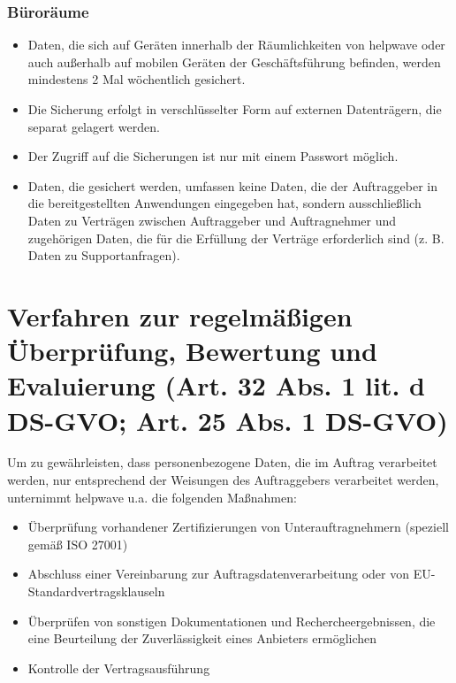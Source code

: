 \documentclass[10pt]{article}
\begin{document}
\subsubsection{Büroräume}
\begin{itemize}
	\item Daten, die sich auf Geräten innerhalb der Räumlichkeiten von helpwave oder auch
	      außerhalb auf mobilen Geräten der Geschäftsführung befinden, werden mindestens
	      2 Mal wöchentlich gesichert.
	\item Die Sicherung erfolgt in verschlüsselter Form auf externen Datenträgern, die separat
	      gelagert werden.
	\item Der Zugriff auf die Sicherungen ist nur mit einem Passwort möglich.
	\item Daten, die gesichert werden, umfassen keine Daten, die der Auftraggeber in die
	      bereitgestellten Anwendungen eingegeben hat, sondern ausschließlich Daten zu
	      Verträgen zwischen Auftraggeber und Auftragnehmer und zugehörigen Daten, die für
	      die Erfüllung der Verträge erforderlich sind (z. B. Daten zu Supportanfragen).
\end{itemize}

\section{Verfahren zur regelmäßigen Überprüfung, Bewertung und Evaluierung (Art. 32 Abs. 1 lit. d DS-GVO; Art. 25 Abs. 1 DS-GVO)}
Um zu gewährleisten, dass personenbezogene Daten, die im Auftrag verarbeitet werden, nur
entsprechend der Weisungen des Auftraggebers verarbeitet werden, unternimmt helpwave
u.a. die folgenden Maßnahmen:
\begin{itemize}
	\item Überprüfung vorhandener Zertifizierungen von Unterauftragnehmern (speziell
	      gemäß ISO 27001)
	\item Abschluss einer Vereinbarung zur Auftragsdatenverarbeitung oder von EU-
	      Standardvertragsklauseln
	\item Überprüfen von sonstigen Dokumentationen und Rechercheergebnissen, die eine
	      Beurteilung der Zuverlässigkeit eines Anbieters ermöglichen
	\item Kontrolle der Vertragsausführung
\end{itemize}
\end{document}
